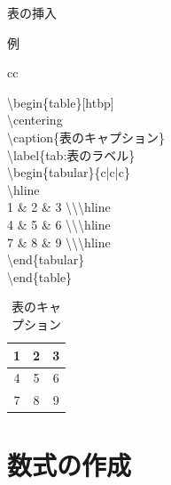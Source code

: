 \documentclass[aspectratio=169, dvipdfmx, 12pt]{beamer}
\begin{document}
\begin{frame}{表の挿入}
  \begin{block}{例}
    \begin{tabular}{cc}
      \begin{minipage}[t]{0.48\hsize}
        \textbackslash begin\{table\}[htbp]\\
        \textbackslash centering\\
        \textbackslash caption\{表のキャプション\}\\
        \textbackslash label\{tab:表のラベル\}\\
        \textbackslash begin\{tabular\}\{c|c|c\}\\
        \textbackslash hline\\
        1 \& 2 \& 3 \textbackslash \textbackslash \textbackslash hline\\
        4 \& 5 \& 6 \textbackslash \textbackslash \textbackslash hline\\
        7 \& 8 \& 9 \textbackslash \textbackslash \textbackslash hline\\
        \textbackslash end\{tabular\}\\
        \textbackslash end\{table\}
      \end{minipage}
      \begin{minipage}[t]{0.48\hsize}
        \begin{table}[htbp]
          \centering
          \caption{表のキャプション}
          \label{tab:表のラベル}
          \begin{tabular}{|c|c|c|}
            \hline
            1 & 2 & 3 \\ \hline
            4 & 5 & 6 \\ \hline
            7 & 8 & 9 \\ \hline
          \end{tabular}
        \end{table}
      \end{minipage}
    \end{tabular}
  \end{block}
\end{frame}

\section{数式の作成}
\end{document}
